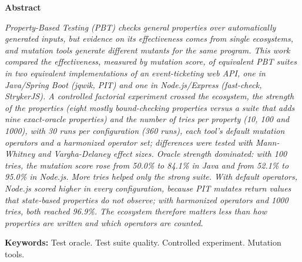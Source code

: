 \begin{center}\textbf{Abstract}\end{center}
\vspace{-6pt}
{\small\noindent\itshape
Property-Based Testing (PBT) checks general properties over automatically generated inputs, but evidence on its effectiveness comes from single ecosystems, and mutation tools generate different mutants for the same program. This work compared the effectiveness, measured by mutation score, of equivalent PBT suites in two equivalent implementations of an event-ticketing web API, one in Java/Spring Boot (jqwik, PIT) and one in Node.js/Express (fast-check, StrykerJS). A controlled factorial experiment crossed the ecosystem, the strength of the properties (eight mostly bound-checking properties versus a suite that adds nine exact-oracle properties) and the number of tries per property (10, 100 and 1000), with 30 runs per configuration (360 runs), each tool's default mutation operators and a harmonized operator set; differences were tested with Mann-Whitney and Vargha-Delaney effect sizes. Oracle strength dominated: with 100 tries, the mutation score rose from 50.0\% to 84.1\% in Java and from 52.1\% to 95.0\% in Node.js. More tries helped only the strong suite. With default operators, Node.js scored higher in every configuration, because PIT mutates return values that state-based properties do not observe; with harmonized operators and 1000 tries, both reached 96.9\%. The ecosystem therefore matters less than how properties are written and which operators are counted.

\noindent\textbf{Keywords:} Test oracle. Test suite quality. Controlled experiment. Mutation tools.\par}

